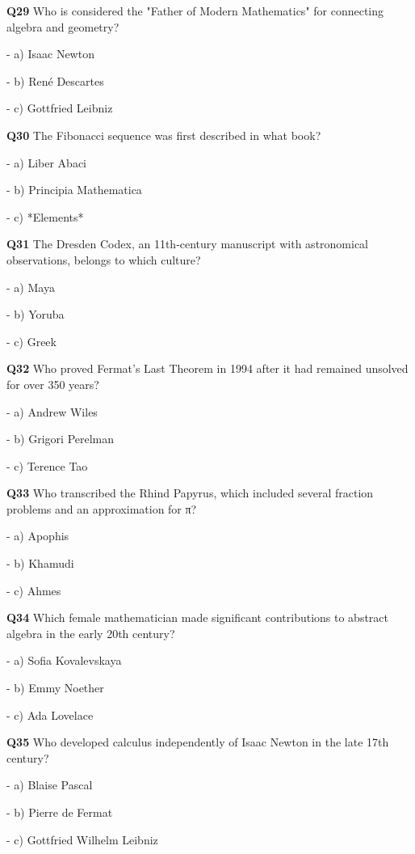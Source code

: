 \textbf{Q29} Who is considered the "Father of Modern Mathematics" for connecting algebra and geometry?\par
\quad - a) Isaac Newton\par
\quad - b) René Descartes\par
\quad - c) Gottfried Leibniz\par

\textbf{Q30} The Fibonacci sequence was first described in what book?\par
\quad - a) Liber Abaci\par
\quad - b) Principia Mathematica\par
\quad - c) *Elements*\par

\textbf{Q31} The Dresden Codex, an 11th‑century manuscript with astronomical observations, belongs to which culture?\par
\quad - a) Maya\par
\quad - b) Yoruba\par
\quad - c) Greek\par

\textbf{Q32} Who proved Fermat's Last Theorem in 1994 after it had remained unsolved for over 350 years?\par
\quad - a) Andrew Wiles\par
\quad - b) Grigori Perelman\par
\quad - c) Terence Tao\par

\textbf{Q33} Who transcribed the Rhind Papyrus, which included several fraction problems and an approximation for π?\par
\quad - a) Apophis\par
\quad - b) Khamudi\par
\quad - c) Ahmes\par

\textbf{Q34} Which female mathematician made significant contributions to abstract algebra in the early 20th century?\par
\quad - a) Sofia Kovalevskaya\par
\quad - b) Emmy Noether\par
\quad - c) Ada Lovelace\par

\textbf{Q35} Who developed calculus independently of Isaac Newton in the late 17th century?\par
\quad - a) Blaise Pascal\par
\quad - b) Pierre de Fermat\par
\quad - c) Gottfried Wilhelm Leibniz\par

